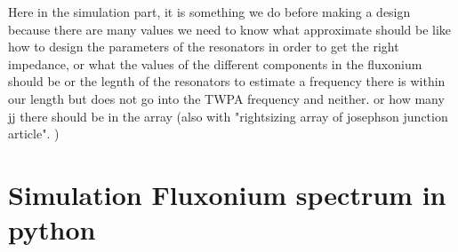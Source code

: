 Here in the simulation part, it is something we do before making a design because there are many values we need to know what approximate should be like how to design the parameters of the resonators in order to get the right impedance, or what the values of the different components in the fluxonium should be or the legnth of the resonators to estimate a frequency there is within our length but does not go into the TWPA frequency and neither. or how many jj there should be in the array (also with "rightsizing array  of josephson junction article". )

\chapter{Simulation Fluxonium spectrum in python}
